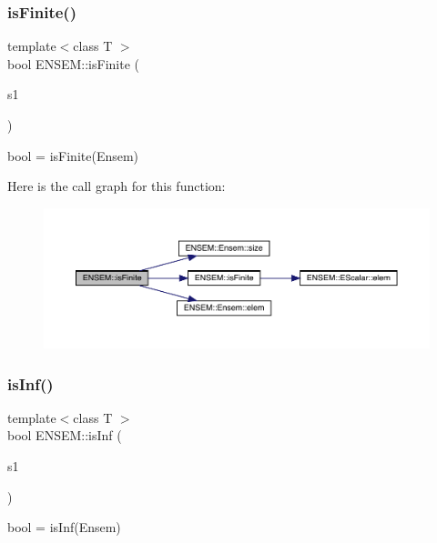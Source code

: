 \subsubsection{\texorpdfstring{isFinite()}{isFinite()}}
{\footnotesize\ttfamily template$<$class T $>$ \\
bool E\+N\+S\+E\+M\+::is\+Finite (\begin{DoxyParamCaption}\item[{const \mbox{\hyperlink{classENSEM_1_1Ensem}{Ensem}}$<$ T $>$ \&}]{s1 }\end{DoxyParamCaption})}



bool = is\+Finite(\+Ensem) 

Here is the call graph for this function\+:\nopagebreak
\begin{figure}[H]
\begin{center}
\leavevmode
\includegraphics[width=350pt]{d1/d9e/group__eensem_ga13016a14218fbe75f26f9acd37e1efe5_cgraph}
\end{center}
\end{figure}
\mbox{\label{group__eensem_gadb04ba05461a486afdf403c61b5bff34}} 
\subsubsection{\texorpdfstring{isInf()}{isInf()}}
{\footnotesize\ttfamily template$<$class T $>$ \\
bool E\+N\+S\+E\+M\+::is\+Inf (\begin{DoxyParamCaption}\item[{const \mbox{\hyperlink{classENSEM_1_1Ensem}{Ensem}}$<$ T $>$ \&}]{s1 }\end{DoxyParamCaption})}



bool = is\+Inf(\+Ensem) 

